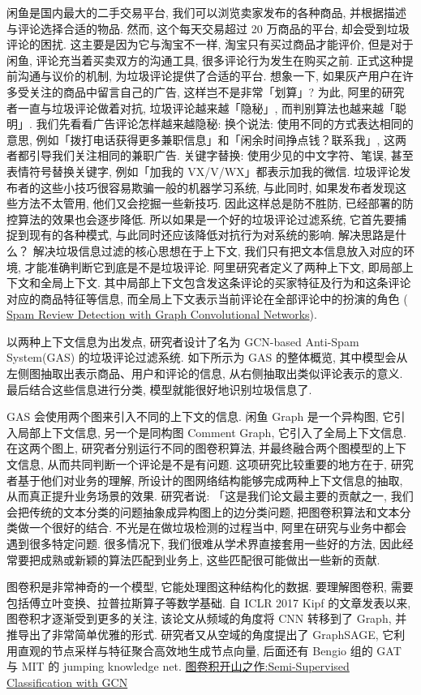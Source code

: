 闲鱼是国内最大的二手交易平台, 我们可以浏览卖家发布的各种商品, 并根据描述与评论选择合适的物品. 然而, 这个每天交易超过 20 万商品的平台, 却会受到垃圾评论的困扰.
这主要是因为它与淘宝不一样, 淘宝只有买过商品才能评价, 但是对于闲鱼, 评论充当着买卖双方的沟通工具, 很多评论行为发生在购买之前.
正式这种提前沟通与议价的机制, 为垃圾评论提供了合适的平台. 想象一下, 如果灰产用户在许多受关注的商品中留言自己的广告, 这样岂不是非常「划算」?
为此, 阿里的研究者一直与垃圾评论做着对抗, 垃圾评论越来越「隐秘」, 而判别算法也越来越「聪明」.
我们先看看广告评论怎样越来越隐秘:
换个说法: 使用不同的方式表达相同的意思, 例如「拨打电话获得更多兼职信息」和「闲余时间挣点钱？联系我」, 这两者都引导我们关注相同的兼职广告.
关键字替换: 使用少见的中文字符、笔误, 甚至表情符号替换关键字, 例如「加我的 VX/V/WX」都表示加我的微信.
垃圾评论发布者的这些小技巧很容易欺骗一般的机器学习系统, 与此同时, 如果发布者发现这些方法不太管用, 他们又会挖掘一些新技巧. 因此这样总是防不胜防, 已经部署的防控算法的效果也会逐步降低. 所以如果是一个好的垃圾评论过滤系统, 它首先要捕捉到现有的各种模式, 与此同时还应该降低对抗行为对系统的影响.
解决思路是什么？
解决垃圾信息过滤的核心思想在于上下文, 我们只有把文本信息放入对应的环境, 才能准确判断它到底是不是垃圾评论.
阿里研究者定义了两种上下文, 即局部上下文和全局上下文. 其中局部上下文包含发这条评论的买家特征及行为和这条评论对应的商品特征等信息,
而全局上下文表示当前评论在全部评论中的扮演的角色 ( \href{https://arxiv.org/abs/1908.10679}{Spam Review Detection with Graph Convolutional Networks}).

以两种上下文信息为出发点, 研究者设计了名为 GCN-based Anti-Spam System(GAS) 的垃圾评论过滤系统. 如下所示为 GAS 的整体概览, 其中模型会从左侧图抽取出表示商品、用户和评论的信息, 从右侧抽取出类似评论表示的意义. 最后结合这些信息进行分类, 模型就能很好地识别垃圾信息了.

GAS 会使用两个图来引入不同的上下文的信息. 闲鱼 Graph 是一个异构图, 它引入局部上下文信息, 另一个是同构图 Comment Graph, 它引入了全局上下文信息.
在这两个图上, 研究者分别运行不同的图卷积算法, 并最终融合两个图模型的上下文信息, 从而共同判断一个评论是不是有问题.
这项研究比较重要的地方在于, 研究者基于他们对业务的理解, 所设计的图网络结构能够完成两种上下文信息的抽取, 从而真正提升业务场景的效果.
研究者说: 「这是我们论文最主要的贡献之一, 我们会把传统的文本分类的问题抽象成异构图上的边分类问题, 把图卷积算法和文本分类做一个很好的结合.
不光是在做垃圾检测的过程当中, 阿里在研究与业务中都会遇到很多特定问题.
很多情况下, 我们很难从学术界直接套用一些好的方法, 因此经常要把成熟或新颖的算法匹配到业务上, 这些匹配很可能做出一些新的贡献.

图卷积是非常神奇的一个模型, 它能处理图这种结构化的数据. 要理解图卷积, 需要包括傅立叶变换、拉普拉斯算子等数学基础.
自 ICLR 2017 Kipf 的文章发表以来, 图卷积才逐渐受到更多的关注, 该论文从频域的角度将 CNN 转移到了 Graph, 并推导出了非常简单优雅的形式.
研究者又从空域的角度提出了 GraphSAGE, 它利用直观的节点采样与特征聚合高效地生成节点向量,
后面还有 Bengio 组的 GAT 与 MIT 的 jumping knowledge net.
\href{https://arxiv.org/abs/1609.02907}{图卷积开山之作:Semi-Supervised Classification with GCN}

